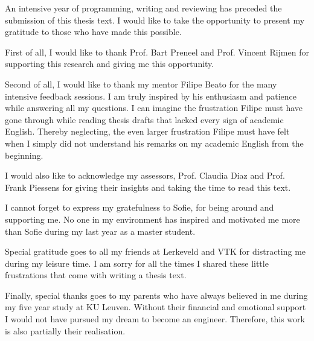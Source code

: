 \documentclass[master=eelt,masteroption=em]{kulemt}
\theoremstyle{plain}
\theoremstyle{definition}
\begin{document}
\begin{preface}
An intensive year of programming, writing and reviewing has preceded the submission of this thesis text. I would like to take the opportunity to present my gratitude to those who have made this possible. 

First of all, I would like to thank Prof. Bart Preneel and Prof. Vincent Rijmen for supporting this research and giving me this opportunity.

Second of all, I would like to thank my mentor Filipe Beato for the many intensive feedback sessions. I am truly inspired by his enthusiasm and patience while answering all my questions. I can imagine the frustration Filipe must have gone through while reading thesis drafts that lacked every sign of academic English. Thereby neglecting, the even larger frustration Filipe must have felt when I simply did not understand his remarks on my academic English from the beginning.

I would also like to acknowledge my assessors, Prof. Claudia Diaz and Prof. Frank Piessens for giving their insights and taking the time to read this text.

I cannot forget to express my gratefulness to Sofie, for being around and supporting me. No one in my environment has inspired and motivated me more than Sofie during my last year as a master student.

Special gratitude goes to all my friends at Lerkeveld and VTK for distracting me during my leisure time. I am sorry for all the times I shared these little frustrations that come with writing a thesis text.

Finally, special thanks goes to my parents who have always believed in me during my five year study at KU Leuven. Without their financial and emotional support I would not have pursued my dream to become an engineer. Therefore, this work is also partially their realisation.

\end{preface}

\tableofcontents*
\end{document}
